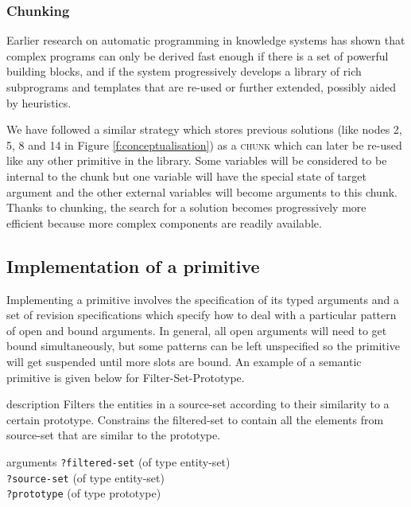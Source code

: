 \subsubsection{Chunking}
\label{s:irl-chunking}

Earlier research on automatic programming in knowledge systems
\citep[see e.g.][]{barstow79knowledge} has shown that complex programs
can only be derived fast enough if there is a set of powerful building
blocks, and if the system progressively develops a library of rich
subprograms and templates that are re-used or further extended,
possibly aided by heuristics.

We have followed a similar strategy which stores previous solutions
(like nodes 2, 5, 8 and 14 in Figure \ref{f:conceptualisation}) as a
\textsc{chunk} which can later be re-used like any other primitive in
the library. Some variables will be considered to be internal to the
chunk but one variable will have the special state of target argument
and the other external variables will become arguments to this
chunk. Thanks to chunking, the search for a solution becomes
progressively more efficient because more complex components are
readily available.

\subsection{Implementation of a primitive}

Implementing a primitive involves the specification of its typed
arguments and a set of revision specifications which specify how to
deal with a particular pattern of open and bound arguments. In
general, all open arguments will need to get bound simultaneously, but
some patterns can be left unspecified so the primitive will get
suspended until more slots are bound. An example of a semantic
primitive is given below for {\sc Filter-Set-Prototype}.


\begin{explanation}{description}
  Filters the entities in a source-set according to their similarity
  to a certain prototype. Constrains the filtered-set to contain all
  the elements from source-set that are similar to the prototype.
\end{explanation}

\begin{explanation}{arguments}
\verb+?filtered-set+ (of type entity-set) \\
\verb+?source-set+ (of type entity-set) \\
\verb+?prototype+ (of type prototype)
\end{explanation}

